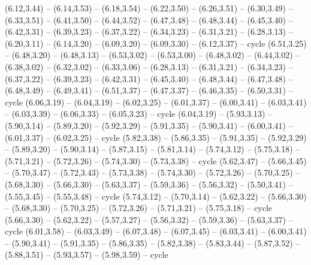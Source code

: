 \expandafter\def\csname geo:gebiet:NGA\endcsname{
  (6.12,3.44) -- (6.14,3.53) -- (6.18,3.54) -- (6.22,3.50) -- (6.26,3.51) -- (6.30,3.49) -- (6.33,3.51) -- (6.41,3.50) -- (6.44,3.52) -- (6.47,3.48) -- (6.48,3.44) -- (6.45,3.40) -- (6.42,3.31) -- (6.39,3.23) -- (6.37,3.22) -- (6.34,3.23) -- (6.31,3.21) -- (6.28,3.13) -- (6.20,3.11) -- (6.14,3.20) -- (6.09,3.20) -- (6.09,3.30) -- (6.12,3.37) -- cycle}
\expandafter\def\csname geo:gebiet:CMR\endcsname{
  (6.51,3.25) -- (6.48,3.20) -- (6.48,3.13) -- (6.53,3.02) -- (6.53,3.00) -- (6.48,3.02) -- (6.44,3.02) -- (6.38,3.02) -- (6.32,3.02) -- (6.33,3.06) -- (6.28,3.13) -- (6.31,3.21) -- (6.34,3.23) -- (6.37,3.22) -- (6.39,3.23) -- (6.42,3.31) -- (6.45,3.40) -- (6.48,3.44) -- (6.47,3.48) -- (6.48,3.49) -- (6.49,3.41) -- (6.51,3.37) -- (6.47,3.37) -- (6.46,3.35) -- (6.50,3.31) -- cycle}
\expandafter\def\csname geo:gebiet:TGO\endcsname{
  (6.06,3.19) -- (6.04,3.19) -- (6.02,3.25) -- (6.01,3.37) -- (6.00,3.41) -- (6.03,3.41) -- (6.03,3.39) -- (6.06,3.33) -- (6.05,3.23) -- cycle}
\expandafter\def\csname geo:gebiet:GHA\endcsname{
  (6.04,3.19) -- (5.93,3.13) -- (5.90,3.14) -- (5.89,3.20) -- (5.92,3.29) -- (5.91,3.35) -- (5.90,3.41) -- (6.00,3.41) -- (6.01,3.37) -- (6.02,3.25) -- cycle}
\expandafter\def\csname geo:gebiet:CIV\endcsname{
  (5.82,3.38) -- (5.86,3.35) -- (5.91,3.35) -- (5.92,3.29) -- (5.89,3.20) -- (5.90,3.14) -- (5.87,3.15) -- (5.81,3.14) -- (5.74,3.12) -- (5.75,3.18) -- (5.71,3.21) -- (5.72,3.26) -- (5.74,3.30) -- (5.73,3.38) -- cycle}
\expandafter\def\csname geo:gebiet:GIN\endcsname{
  (5.62,3.47) -- (5.66,3.45) -- (5.70,3.47) -- (5.72,3.43) -- (5.73,3.38) -- (5.74,3.30) -- (5.72,3.26) -- (5.70,3.25) -- (5.68,3.30) -- (5.66,3.30) -- (5.63,3.37) -- (5.59,3.36) -- (5.56,3.32) -- (5.50,3.41) -- (5.55,3.45) -- (5.55,3.48) -- cycle}
\expandafter\def\csname geo:gebiet:GNB\endcsname{
  }
\expandafter\def\csname geo:gebiet:LBR\endcsname{
  (5.74,3.12) -- (5.70,3.14) -- (5.62,3.22) -- (5.66,3.30) -- (5.68,3.30) -- (5.70,3.25) -- (5.72,3.26) -- (5.71,3.21) -- (5.75,3.18) -- cycle}
\expandafter\def\csname geo:gebiet:SLE\endcsname{
  (5.66,3.30) -- (5.62,3.22) -- (5.57,3.27) -- (5.56,3.32) -- (5.59,3.36) -- (5.63,3.37) -- cycle}
\expandafter\def\csname geo:gebiet:BFA\endcsname{
  (6.01,3.58) -- (6.03,3.49) -- (6.07,3.48) -- (6.07,3.45) -- (6.03,3.41) -- (6.00,3.41) -- (5.90,3.41) -- (5.91,3.35) -- (5.86,3.35) -- (5.82,3.38) -- (5.83,3.44) -- (5.87,3.52) -- (5.88,3.51) -- (5.93,3.57) -- (5.98,3.59) -- cycle}
